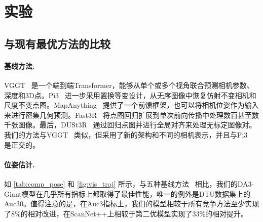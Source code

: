 
\newpage
\section{实验}




\subsection{与现有最优方法的比较}

\paragraph{基线方法.}
VGGT~\citep{wang2025vggt} 是一个端到端Transformer，能够从单个或多个视角联合预测相机参数、深度和3D点。Pi3~\citep{wang2025pi3} 进一步采用置换等变设计，从无序图像中恢复仿射不变相机和尺度不变点图。MapAnything~\citep{keetha2025mapanything} 提供了一个前馈框架，也可以将相机位姿作为输入来进行密集几何预测。Fast3R~\citep{yang2025fast3r} 将点图回归扩展到单次前向传播中处理数百甚至数千张图像。最后，DUSt3R~\citep{wang2024dust3r} 通过回归点图并进行全局对齐来处理无标定图像对。我们的方法与VGGT~\citep{wang2025vggt} 类似，但采用了新的架构和不同的相机表示，并且与Pi3~\citep{wang2025pi3} 是正交的。

\paragraph{位姿估计.}
如 \cref{tab:comp_pose} 和 \cref{fig:vis_traj} 所示，与五种基线方法~\citep{dust3r,wang2025vggt,fast3r,wang2025pi3,keetha2025mapanything} 相比，我们的DA3-Giant模型在几乎所有指标上都取得了最佳性能，唯一的例外是DTU数据集上的Auc30。值得注意的是，在Auc3指标上，我们的模型相较于所有竞争方法至少实现了$8\%$的相对改进，在ScanNet++上相较于第二优模型实现了$33\%$的相对提升。




